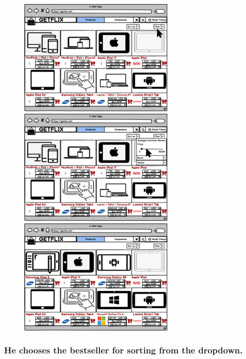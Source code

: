\documentclass[]{article}
\begin{document}
\begin{figure}[H]
    \centering
    \includegraphics[height=2.2in]{./images/41.jpg}
    \includegraphics[height=2.2in]{./images/42.jpg}
    \includegraphics[height=2.2in]{./images/43.jpg}
\end{figure}

\hypertarget{he-chooses-the-bestseller-for-sorting-from-the-dropdown.}{%
    \subsubsection{He chooses the bestseller for sorting from the
        dropdown.}\label{he-chooses-the-bestseller-for-sorting-from-the-dropdown.}}
\end{document}
